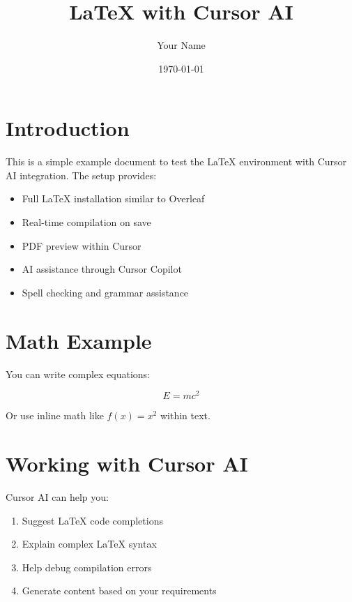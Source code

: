 \documentclass[12pt,a4paper]{article}
\title{LaTeX with Cursor AI}
\author{Your Name}
\date{\today}
\begin{document}
\maketitle

\section{Introduction}
This is a simple example document to test the LaTeX environment with Cursor AI integration. The setup provides:

\begin{itemize}
    \item Full LaTeX installation similar to Overleaf
    \item Real-time compilation on save
    \item PDF preview within Cursor
    \item AI assistance through Cursor Copilot
    \item Spell checking and grammar assistance
\end{itemize}

\section{Math Example}
You can write complex equations:

\begin{equation}
    E = mc^2
\end{equation}

Or use inline math like $f(x) = x^2$ within text.

\section{Working with Cursor AI}
Cursor AI can help you:
\begin{enumerate}
    \item Suggest LaTeX code completions
    \item Explain complex LaTeX syntax
    \item Help debug compilation errors
    \item Generate content based on your requirements
\end{enumerate}
\end{document}
